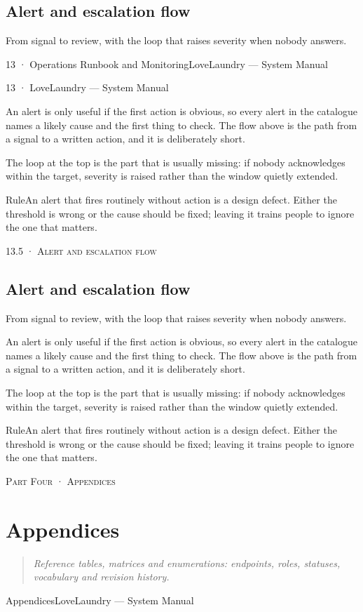 \documentclass[11pt,a4paper,oneside]{book}
\begin{document}
\section*{Alert and escalation flow}
From signal to review, with the loop that raises severity when nobody answers.

13 · Operations Runbook and MonitoringLoveLaundry — System Manual

13 · LoveLaundry — System Manual

An alert is only useful if the first action is obvious, so every alert in the catalogue names a likely cause and the first thing to check. The flow above is the path from a signal to a written action, and it is deliberately short.

The loop at the top is the part that is usually missing: if nobody acknowledges within the target, severity is raised rather than the window quietly extended.

\begin{notebox}RuleAn alert that fires routinely without action is a design defect. Either the threshold is wrong or the cause should be fixed; leaving it trains people to ignore the one that matters.\end{notebox}
\textsc{\small\color{crimson}13.5 · Alert and escalation flow}\par\medskip
\section*{Alert and escalation flow}
From signal to review, with the loop that raises severity when nobody answers.

An alert is only useful if the first action is obvious, so every alert in the catalogue names a likely cause and the first thing to check. The flow above is the path from a signal to a written action, and it is deliberately short.

The loop at the top is the part that is usually missing: if nobody acknowledges within the target, severity is raised rather than the window quietly extended.

\begin{notebox}RuleAn alert that fires routinely without action is a design defect. Either the threshold is wrong or the cause should be fixed; leaving it trains people to ignore the one that matters.\end{notebox}
\textsc{\small\color{crimson}Part Four · Appendices}\par\medskip
\chapter{Appendices}
\begin{quote}\itshape Reference tables, matrices and enumerations: endpoints, roles, statuses, vocabulary and revision history.\end{quote}
AppendicesLoveLaundry — System Manual
\end{document}
